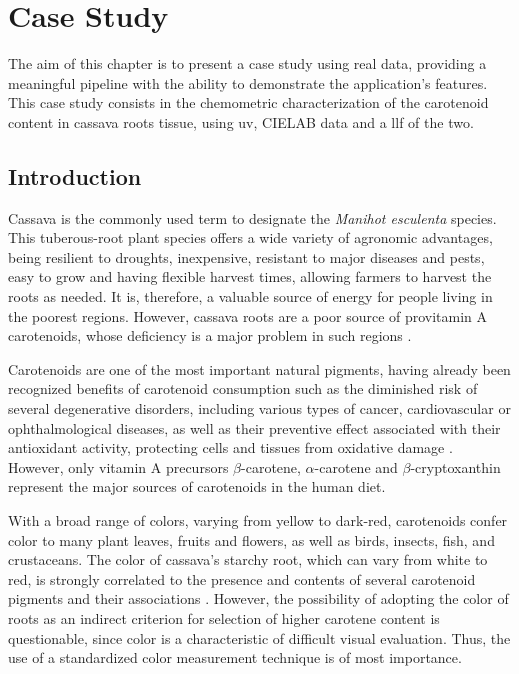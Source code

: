 
\chapter{Case Study} \label{case_study}

The aim of this chapter is to present a case study using real data, providing a meaningful pipeline with the ability to demonstrate the application's features. This case study consists in the chemometric characterization of the carotenoid content in cassava roots tissue, using \gls{uv}, CIELAB data and a \acrlong{llf} of the two.


\section{Introduction}

Cassava is the commonly used term to designate the \textit{Manihot esculenta} species. This tuberous-root plant species offers a wide variety of agronomic advantages, being resilient to droughts, inexpensive, resistant to major diseases and pests, easy to grow and having flexible harvest times, allowing farmers to harvest the roots as needed. It is, therefore, a valuable source of energy for people living in the poorest regions. However, cassava roots are a poor source of provitamin A carotenoids, whose deficiency is a major problem in such regions \citep{la2013biofortified, sanchez2014prediction}. 

Carotenoids are one of the most important natural pigments, having already been recognized benefits of carotenoid consumption such as the diminished risk of several degenerative disorders, including various types of cancer, cardiovascular or ophthalmological diseases, as well as their preventive effect associated with their antioxidant activity, protecting cells and tissues from oxidative damage \citep{stahl2003antioxidant}. However, only vitamin A precursors $\beta$-carotene, $\alpha$-carotene and $\beta$-cryptoxanthin represent the major sources of carotenoids in the human diet.

With a broad range of colors, varying from yellow to dark-red, carotenoids confer color to many plant leaves, fruits and flowers, as well as birds, insects, fish, and crustaceans. The color of cassava's starchy root, which can vary from white to red, is strongly correlated to the presence and contents of several carotenoid pigments and their associations \citep{sanchez2006reduction}. However, the possibility of adopting the color of roots as an indirect criterion for selection of higher carotene content is questionable, since color is a characteristic of difficult visual evaluation. Thus, the use of a standardized color measurement technique is of most importance.

